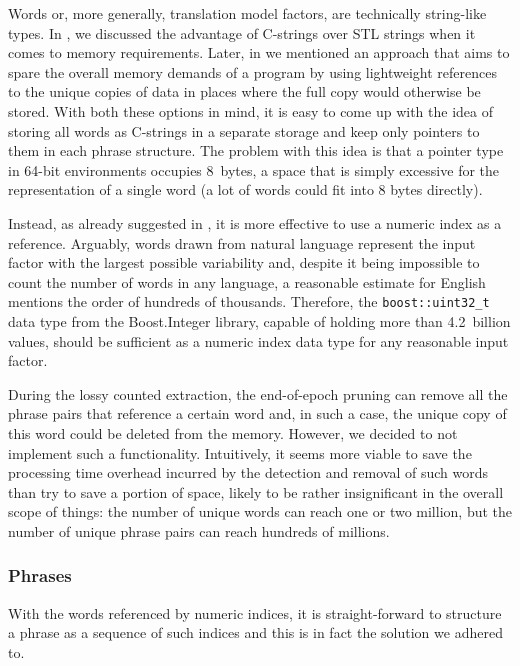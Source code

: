 Words or, more generally, translation model factors, are technically string-like types.
In , we discussed the advantage of C-strings over STL strings when
it comes to memory requirements.
Later, in  we mentioned an approach that aims to spare the
overall memory demands of a program by using lightweight references to the unique copies of
data in places where the full copy would otherwise be stored.
With both these options in mind, it is easy to come up with the idea of storing all words as
C-strings in a separate storage and keep only pointers to them in each phrase structure.
The problem with this idea is that a pointer type in 64-bit environments occupies
8~bytes, a space that is simply excessive for the representation of a single word (a lot of
words could fit into 8 bytes directly).

Instead, as already suggested in , it is more effective to
use a numeric index as a reference.
Arguably, words drawn from natural language represent the input factor with the largest possible
variability and, despite it being impossible to count the number of words in any language,
a reasonable estimate for English mentions the order of hundreds of thousands.
Therefore, the \texttt{boost::uint32_t} data type from the Boost.Integer library, capable
of holding more than 4.2~billion values, should be sufficient as a numeric index data
type for any reasonable input factor.

During the lossy counted extraction, the end-of-epoch pruning can remove all the phrase
pairs that reference a certain word and, in such a case, the unique copy of this word could
be deleted from the memory. However, we decided to not implement such a functionality.
Intuitively, it seems more viable to save the processing time overhead incurred by
the detection and removal of such words than try to save a portion of space, likely to
be rather insignificant in the overall scope of things: the number of unique words can reach
one or two million, but the number of unique phrase pairs can reach hundreds of millions.

\subsubsection*{Phrases}

With the words referenced by numeric indices, it is straight-forward to structure a phrase
as a sequence of such indices and this is in fact the solution we adhered to.

